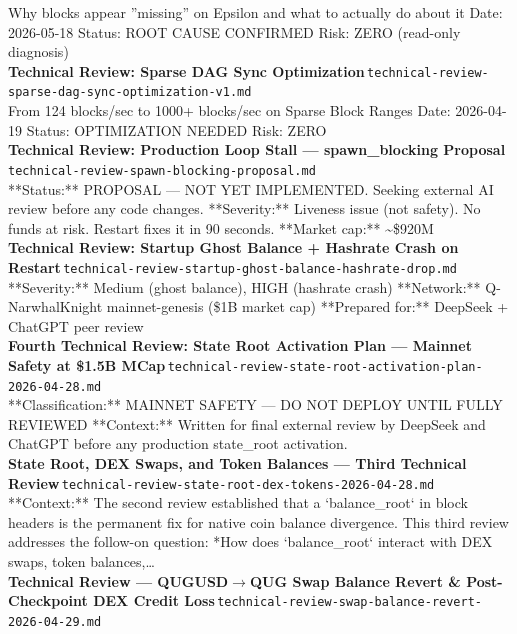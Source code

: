 \documentclass[11pt,a4paper]{article}
\begin{document}
Why blocks appear ''missing'' on Epsilon and what to actually do about it Date: 2026-05-18 \textbar{} Status: ROOT CAUSE CONFIRMED \textbar{} Risk: ZERO (read-only diagnosis)\\[6pt]
\noindent\textbf{Technical Review: Sparse DAG Sync Optimization}\,\textcolor{qgray}{\small \texttt{technical-review-sparse-dag-sync-optimization-v1.md}}\\
From 124 blocks/sec to 1000+ blocks/sec on Sparse Block Ranges Date: 2026-04-19 \textbar{} Status: OPTIMIZATION NEEDED \textbar{} Risk: ZERO\\[6pt]
\noindent\textbf{Technical Review: Production Loop Stall --- spawn\_blocking Proposal}\,\textcolor{qgray}{\small \texttt{technical-review-spawn-blocking-proposal.md}}\\
**Status:** PROPOSAL --- NOT YET IMPLEMENTED. Seeking external AI review before any code changes. **Severity:** Liveness issue (not safety). No funds at risk. Restart fixes it in 90 seconds. **Market cap:** \textasciitilde{}\$920M\\[6pt]
\noindent\textbf{Technical Review: Startup Ghost Balance + Hashrate Crash on Restart}\,\textcolor{qgray}{\small \texttt{technical-review-startup-ghost-balance-hashrate-drop.md}}\\
**Severity:** Medium (ghost balance), HIGH (hashrate crash) **Network:** Q-NarwhalKnight mainnet-genesis (\$1B market cap) **Prepared for:** DeepSeek + ChatGPT peer review\\[6pt]
\noindent\textbf{Fourth Technical Review: State Root Activation Plan --- Mainnet Safety at \$1.5B MCap}\,\textcolor{qgray}{\small \texttt{technical-review-state-root-activation-plan-2026-04-28.md}}\\
**Classification:** MAINNET SAFETY --- DO NOT DEPLOY UNTIL FULLY REVIEWED **Context:** Written for final external review by DeepSeek and ChatGPT before any production state\_root activation.\\[6pt]
\noindent\textbf{State Root, DEX Swaps, and Token Balances --- Third Technical Review}\,\textcolor{qgray}{\small \texttt{technical-review-state-root-dex-tokens-2026-04-28.md}}\\
**Context:** The second review established that a `balance\_root` in block headers is the permanent fix for native coin balance divergence. This third review addresses the follow-on question: *How does `balance\_root` interact with DEX swaps, token balances,\ldots{}\\[6pt]
\noindent\textbf{Technical Review --- QUGUSD$\rightarrow$QUG Swap Balance Revert \& Post-Checkpoint DEX Credit Loss}\,\textcolor{qgray}{\small \texttt{technical-review-swap-balance-revert-2026-04-29.md}}\\
\end{document}

